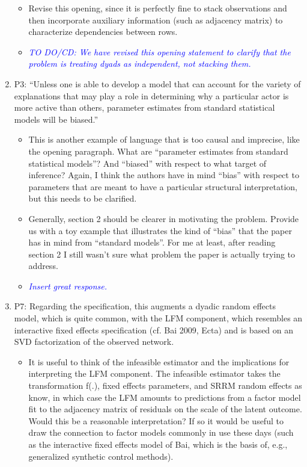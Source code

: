 \begin{enumerate}
	\begin{itemize}
		\item Revise this opening, since it is perfectly fine to stack observations and then incorporate auxiliary information (such as adjacency matrix) to characterize dependencies between rows.
	\end{itemize}
	\begin{itemize}
		\item \textcolor{blue}{ \emph{
		TO DO/CD: We have revised this opening statement to clarify that the problem is treating dyads as independent, not stacking them.
		}}
	\end{itemize}
	\item P3: “Unless one is able to develop a model that can account for the variety of explanations that may play a role in determining why a particular actor is more active than others, parameter estimates from standard statistical models will be biased.”
	\begin{itemize}
		\item This is another example of language that is too causal and imprecise, like the opening paragraph. What are “parameter estimates from standard statistical models”?  And “biased” with respect to what target of inference? Again, I think the authors have in mind “bias” with respect to parameters that are meant to have a particular structural interpretation, but this needs to be clarified.
		\item Generally, section 2 should be clearer in motivating the problem.  Provide us with a toy example that illustrates the kind of “bias” that the paper has in mind from “standard models”.  For me at least, after reading section 2 I still wasn’t sure what problem the paper is actually trying to address.
	\end{itemize}
	\begin{itemize}
		\item \textcolor{blue}{ \emph{
		Insert great response.
		}}
	\end{itemize}
	\item P7: Regarding the specification, this augments a dyadic random effects model, which is quite common, with  the LFM component, which resembles an interactive fixed effects specification (cf. Bai 2009, Ecta) and is based on an SVD factorization of the observed network.
	\begin{itemize}
		\item It is useful to think of the infeasible estimator and the implications for interpreting the LFM component.  The infeasible estimator takes the transformation f(.), fixed effects parameters, and SRRM random effects as know, in which case the LFM amounts to predictions from a factor model fit to the adjacency matrix of residuals on the scale of the latent outcome.  Would this be a reasonable interpretation? If so it would be useful to draw the connection to factor models commonly in use these days (such as the interactive fixed effects model of Bai, which is the basis of, e.g., generalized synthetic control methods).

\end{itemize}
\end{enumerate}
